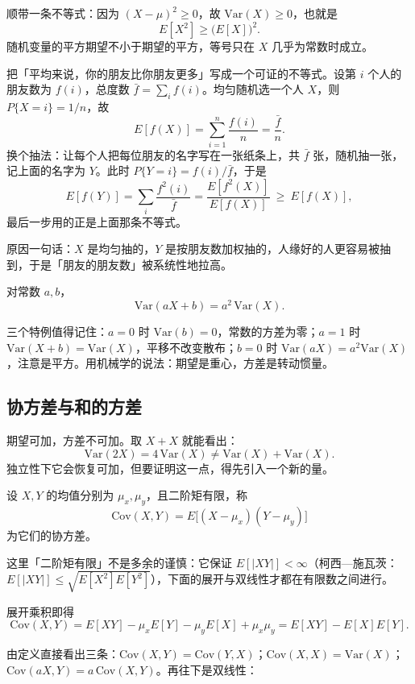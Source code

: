 顺带一条不等式：因为 $(X-\mu)^2\ge 0$，故 $\mathrm{Var}(X)\ge 0$，也就是
\[
E[X^2]\ge\big(E[X]\big)^2 .
\]
随机变量的平方期望不小于期望的平方，等号只在 $X$ 几乎为常数时成立。

\begin{example}[友谊悖论]
把「平均来说，你的朋友比你朋友更多」写成一个可证的不等式。设第 $i$ 个人的朋友数为 $f(i)$，总度数 $\bar f=\sum_if(i)$。均匀随机选一个人 $X$，则 $P\{X=i\}=1/n$，故
\[
E[f(X)]=\sum_{i=1}^n\frac{f(i)}{n}=\frac{\bar f}{n}.
\]
换个抽法：让每个人把每位朋友的名字写在一张纸条上，共 $\bar f$ 张，随机抽一张，记上面的名字为 $Y$。此时 $P\{Y=i\}=f(i)/\bar f$，于是
\[
E[f(Y)]=\sum_i\frac{f^2(i)}{\bar f}=\frac{E[f^2(X)]}{E[f(X)]}\ \ge\ E[f(X)] ,
\]
最后一步用的正是上面那条不等式。
\end{example}

原因一句话：$X$ 是均匀抽的，$Y$ 是按朋友数加权抽的，人缘好的人更容易被抽到，于是「朋友的朋友数」被系统性地拉高。

\begin{proposition}[仿射变换的方差]
对常数 $a,b$，
\[
\mathrm{Var}(aX+b)=a^2\,\mathrm{Var}(X).
\]
\end{proposition}

三个特例值得记住：$a=0$ 时 $\mathrm{Var}(b)=0$，常数的方差为零；$a=1$ 时 $\mathrm{Var}(X+b)=\mathrm{Var}(X)$，平移不改变散布；$b=0$ 时 $\mathrm{Var}(aX)=a^2\mathrm{Var}(X)$，注意是平方。用机械学的说法：期望是重心，方差是转动惯量。

\subsection{协方差与和的方差}

期望可加，方差不可加。取 $X+X$ 就能看出：
\[
\mathrm{Var}(2X)=4\,\mathrm{Var}(X)\ne \mathrm{Var}(X)+\mathrm{Var}(X).
\]
独立性下它会恢复可加，但要证明这一点，得先引入一个新的量。

\begin{definition}[协方差]
设 $X,Y$ 的均值分别为 $\mu_x,\mu_y$，且二阶矩有限，称
\[
\mathrm{Cov}(X,Y)=E\big[(X-\mu_x)(Y-\mu_y)\big]
\]
为它们的协方差。
\end{definition}

这里「二阶矩有限」不是多余的谨慎：它保证 $E[|XY|]<\infty$（柯西—施瓦茨：$E[|XY|]\le\sqrt{E[X^2]E[Y^2]}$），下面的展开与双线性才都在有限数之间进行。

展开乘积即得
\[
\mathrm{Cov}(X,Y)=E[XY]-\mu_xE[Y]-\mu_yE[X]+\mu_x\mu_y=E[XY]-E[X]E[Y].
\]

由定义直接看出三条：$\mathrm{Cov}(X,Y)=\mathrm{Cov}(Y,X)$；$\mathrm{Cov}(X,X)=\mathrm{Var}(X)$；$\mathrm{Cov}(aX,Y)=a\,\mathrm{Cov}(X,Y)$。再往下是双线性：

